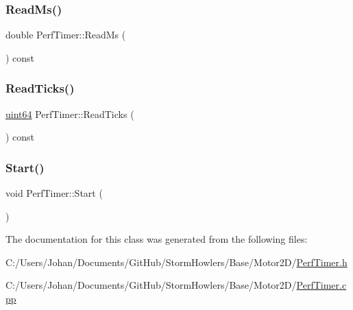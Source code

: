 \subsubsection{\texorpdfstring{ReadMs()}{ReadMs()}}
{\footnotesize\ttfamily double Perf\+Timer\+::\+Read\+Ms (\begin{DoxyParamCaption}{ }\end{DoxyParamCaption}) const}

\mbox{\label{class_perf_timer_ab304eb5e12e6d7ed137953c3a8914e13}} 
\subsubsection{\texorpdfstring{ReadTicks()}{ReadTicks()}}
{\footnotesize\ttfamily \mbox{\hyperlink{_defs_8h_ac6afe794ed283c11fb63426a58188e5e}{uint64}} Perf\+Timer\+::\+Read\+Ticks (\begin{DoxyParamCaption}{ }\end{DoxyParamCaption}) const}

\mbox{\label{class_perf_timer_a2f429d6c4b576d41194b072dbe3c13e1}} 
\subsubsection{\texorpdfstring{Start()}{Start()}}
{\footnotesize\ttfamily void Perf\+Timer\+::\+Start (\begin{DoxyParamCaption}{ }\end{DoxyParamCaption})}



The documentation for this class was generated from the following files\+:\begin{DoxyCompactItemize}
\item 
C\+:/\+Users/\+Johan/\+Documents/\+Git\+Hub/\+Storm\+Howlers/\+Base/\+Motor2\+D/\mbox{\hyperlink{_perf_timer_8h}{Perf\+Timer.\+h}}\item 
C\+:/\+Users/\+Johan/\+Documents/\+Git\+Hub/\+Storm\+Howlers/\+Base/\+Motor2\+D/\mbox{\hyperlink{_perf_timer_8cpp}{Perf\+Timer.\+cpp}}\end{DoxyCompactItemize}
